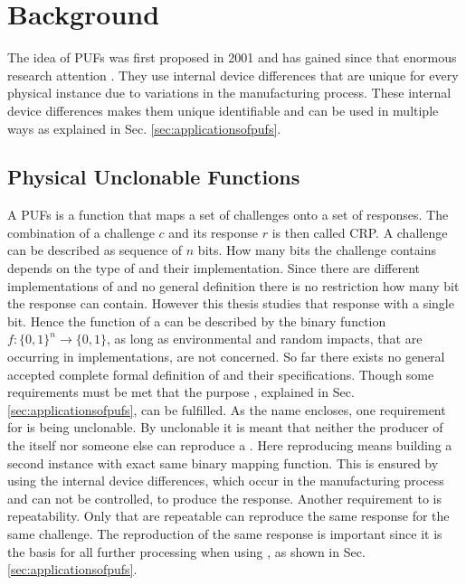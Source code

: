 \chapter{Background}
\label{cap:background}

The idea of \acfp{PUF} was first proposed in 2001 and has gained since that enormous research attention \cite{Pappu2001PhysicalFunctions}. %
They use internal device differences that are unique for every physical instance due to variations in the manufacturing process.
These internal device differences makes them unique identifiable and can be used in multiple ways as explained in Sec. \ref{sec:applicationsofpufs}.


\section{Physical Unclonable Functions}
\label{sec:pyhsicalunclonablefunctions}

A \acfp{PUF} is a function that maps a set of challenges onto a set of responses.
The combination of a challenge $c$ and its response $r$ is then called \ac{CRP}.
A challenge can be described as sequence of $n$ bits.
How many bits the challenge contains depends on the type of \puf and their implementation.
Since there are different implementations of \pufs and no general definition there is no restriction how many bit the response can contain.
However this thesis studies \pufs that response with a single bit.
Hence the function of a \puf can be described by the binary function $f: \{0, 1\}^n \to \{0,1\}$, as long as environmental and random impacts, that are occurring in \puf implementations, are not concerned.
So far there exists no general accepted complete formal definition of \pufs and their specifications. %
Though some requirements must be met that the purpose \pufs, explained in Sec. \ref{sec:applicationsofpufs}, can be fulfilled.
As the name encloses, one requirement for \pufs is being unclonable. %
By unclonable it is meant that neither the producer of the \puf itself nor someone else can reproduce a \puf.
Here reproducing means building a second instance with exact same binary mapping function.
This is ensured by using the internal device differences, which occur in the manufacturing process and can not be controlled, to produce the \puf response.
Another requirement to \pufs is repeatability.
Only \pufs that are repeatable can reproduce the same response for the same challenge.
The reproduction of the same response is important since it is the basis for all further processing when using \pufs, as shown in Sec. \ref{sec:applicationsofpufs}. %

